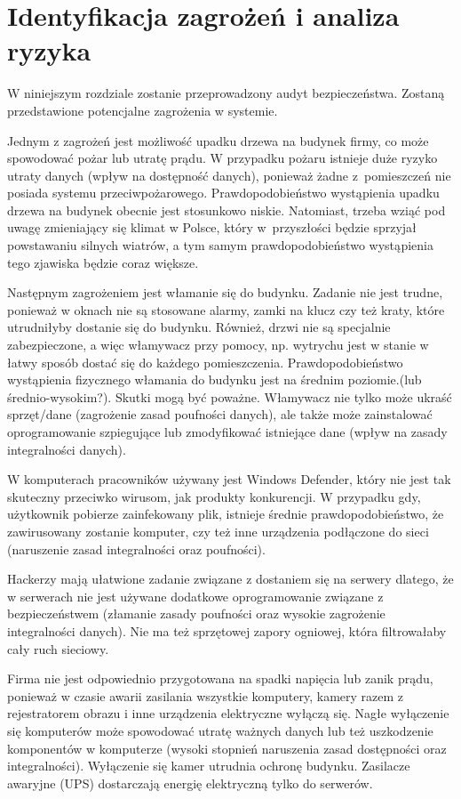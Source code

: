 \newpage\section{Identyfikacja zagrożeń \newline i analiza ryzyka}
W niniejszym rozdziale zostanie przeprowadzony audyt bezpieczeństwa. Zostaną przedstawione potencjalne zagrożenia w systemie.

Jednym z zagrożeń jest możliwość upadku drzewa na budynek firmy, co może spowodować pożar lub utratę prądu. W przypadku pożaru istnieje duże ryzyko utraty danych (wpływ na dostępność danych), ponieważ żadne z~pomieszczeń nie posiada systemu przeciwpożarowego.  Prawdopodobieństwo wystąpienia upadku drzewa na budynek obecnie jest stosunkowo niskie. Natomiast, trzeba wziąć pod uwagę zmieniający się klimat w Polsce, który w~przyszłości będzie sprzyjał powstawaniu silnych wiatrów, a tym samym prawdopodobieństwo wystąpienia tego zjawiska będzie coraz większe.

Następnym zagrożeniem jest włamanie się do budynku. Zadanie nie jest trudne, ponieważ w oknach nie są stosowane alarmy, zamki na klucz czy też kraty, które utrudniłyby dostanie się do budynku. Również, drzwi nie są specjalnie zabezpieczone, a więc włamywacz przy pomocy, np. wytrychu jest w stanie w łatwy sposób dostać się do każdego pomieszczenia. Prawdopodobieństwo wystąpienia fizycznego włamania do budynku jest na średnim poziomie.(lub średnio-wysokim?). Skutki mogą być poważne. Włamywacz nie tylko może ukraść sprzęt/dane (zagrożenie zasad poufności danych), ale także może zainstalować oprogramowanie szpiegujące lub zmodyfikować istniejące dane (wpływ na zasady integralności danych).

W komputerach pracowników używany jest Windows Defender, który nie jest tak skuteczny przeciwko wirusom, jak produkty konkurencji. W przypadku gdy, użytkownik pobierze zainfekowany plik, istnieje średnie prawdopodobieństwo, że zawirusowany zostanie komputer, czy też inne urządzenia podłączone do sieci (naruszenie zasad integralności oraz poufności).

Hackerzy mają ułatwione zadanie związane z dostaniem się na serwery dlatego, że w serwerach nie jest używane dodatkowe oprogramowanie związane z bezpieczeństwem (złamanie zasady poufności oraz wysokie zagrożenie integralności danych). Nie ma też sprzętowej zapory ogniowej, która filtrowałaby cały ruch sieciowy.	

Firma nie jest odpowiednio przygotowana na spadki napięcia lub zanik prądu, ponieważ w czasie awarii zasilania wszystkie komputery, kamery \linebreak razem z rejestratorem obrazu i inne urządzenia elektryczne wyłączą się. Nagłe wyłączenie się komputerów może spowodować utratę ważnych danych lub też uszkodzenie komponentów w komputerze (wysoki stopnień naruszenia zasad dostępności oraz integralności). Wyłączenie się kamer utrudnia ochronę budynku. Zasilacze awaryjne (UPS) dostarczają energię elektryczną tylko do serwerów. 

